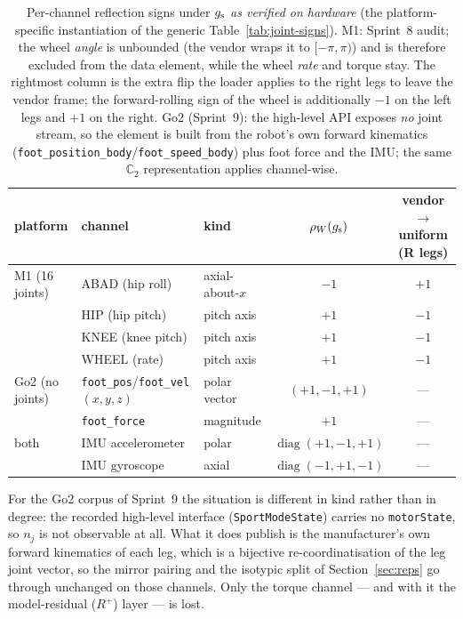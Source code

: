 \begin{table}[ht]
\centering
\footnotesize
\begin{tabular}{@{}p{2.4cm}p{3.3cm}p{2.3cm}cc@{}}
\toprule
platform & channel & kind & $\rho_{W}(g_{\mathrm{s}})$ & vendor$\to$uniform (R legs) \\
\midrule
M1 (16 joints) & ABAD (hip roll) & axial-about-$x$ & $-1$ & $+1$ \\
               & HIP (hip pitch) & pitch axis & $+1$ & $-1$ \\
               & KNEE (knee pitch) & pitch axis & $+1$ & $-1$ \\
               & WHEEL (rate) & pitch axis & $+1$ & $-1$ \\
\midrule
Go2 (no joints) & \texttt{foot\_pos}/\texttt{foot\_vel} $(x,y,z)$ & polar vector & $(+1,-1,+1)$ & --- \\
               & \texttt{foot\_force} & magnitude & $+1$ & --- \\
\midrule
both & IMU accelerometer & polar & $\operatorname{diag}(+1,-1,+1)$ & --- \\
     & IMU gyroscope & axial & $\operatorname{diag}(-1,+1,-1)$ & --- \\
\bottomrule
\end{tabular}
\caption{Per-channel reflection signs under $g_{\mathrm{s}}$ \emph{as verified on hardware} (the platform-specific instantiation of the generic Table~\ref{tab:joint-signs}). M1:
Sprint~8 audit; the wheel \emph{angle} is unbounded (the vendor wraps it to
$[-\pi,\pi)$) and is therefore excluded from the data element, while the wheel
\emph{rate} and torque stay. The rightmost column is the extra flip the loader
applies to the right legs to leave the vendor frame; the forward-rolling sign of
the wheel is additionally $-1$ on the left legs and $+1$ on the right. Go2
(Sprint~9): the high-level API exposes \emph{no} joint stream, so the element is
built from the robot's own forward kinematics
(\texttt{foot\_position\_body}/\texttt{foot\_speed\_body}) plus foot force and
the IMU; the same $\mathbb{C}_2$ representation applies channel-wise.}
\label{tab:joint-signs-hw}
\end{table}

For the Go2 corpus of Sprint~9 the situation is different in kind rather than in
degree: the recorded high-level interface (\texttt{SportModeState}) carries no
\texttt{motorState}, so $n_j$ is not observable at all. What it does publish is
the manufacturer's own forward kinematics of each leg, which is a bijective
re-coordinatisation of the leg joint vector, so the mirror pairing and the
isotypic split of Section~\ref{sec:reps} go through unchanged on those channels.
Only the torque channel --- and with it the model-residual ($R^+$) layer --- is
lost.
